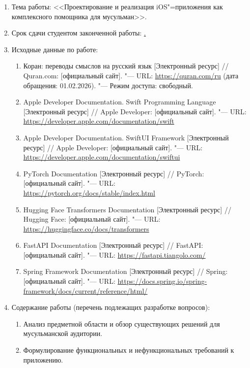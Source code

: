 \begin{enumerate}[1.]
	\item Тема работы: {\expandafter \ulined <<Проектирование и реализация iOS"=при\-ложения как комплексного помощника для мусульман>>.}
	\item Срок сдачи студентом законченной работы: \uline{\thesisDeadline.}
	\item Исходные данные по работе:
	\begin{enumerate}[label=\theenumi\arabic*.]
		\sloppy
		\item Коран: переводы смыслов на русский язык [Электронный ресурс] // Quran.com: [официальный сайт]. "--- URL: \url{https://quran.com/ru} (дата обращения: 01.02.2026). "--- Режим доступа: свободный.
		\item Apple Developer Documentation. Swift Programming Language [Электронный ресурс] // Apple Developer: [официальный сайт]. "--- URL: \url{https://developer.apple.com/documentation/swift}
		\item Apple Developer Documentation. SwiftUI Framework [Электронный ресурс] // Apple Developer: [официальный сайт]. "--- URL: \url{https://developer.apple.com/documentation/swiftui}
		\item PyTorch Documentation [Электронный ресурс] // PyTorch: [официальный сайт]. "--- URL: \url{https://pytorch.org/docs/stable/index.html}
		\item Hugging Face Transformers Documentation [Электронный ресурс] // Hugging Face: [официальный сайт]. "--- URL: \url{https://huggingface.co/docs/transformers}
		\item FastAPI Documentation [Электронный ресурс] // FastAPI: [официальный сайт]. "--- URL: \url{https://fastapi.tiangolo.com/}
		\item Spring Framework Documentation [Электронный ресурс] // Spring: [официальный сайт]. "--- URL: \url{https://docs.spring.io/spring-framework/docs/current/reference/html/}
	\end{enumerate}
	\item Содержание работы (перечень подлежащих разработке вопросов):
	\begin{enumerate}[label=\theenumi\arabic*.]
		\item Анализ предметной области и обзор существующих решений для мусульманской аудитории.
		\item Формулирование функциональных и нефункциональных требований к приложению.

\end{enumerate}
\end{enumerate}
